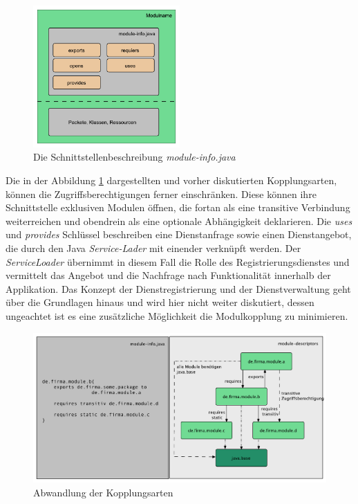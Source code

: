     \begin{figure}[h!]
      \centering
      \includegraphics[width=0.5\textwidth]{material/images/module-info.pdf}
      \caption{Die Schnittstellenbeschreibung \textit{module-info.java}}
      \label{fig:module-info}
    \end{figure}

    Die in der Abbildung \ref{fig:module-info} dargestellten und vorher diskutierten Kopplungsarten, können die Zugriffsberechtigungen ferner einschränken. Diese können ihre Schnittstelle exklusiven Modulen öffnen, die fortan als eine transitive Verbindung weiterreichen und obendrein als eine optionale Abhängigkeit deklarieren. Die \textit{uses} und \textit{provides} Schlüssel beschreiben eine Dienstanfrage sowie einen Dienstangebot, die durch den Java \textit{Service-Lader} mit einender verknüpft werden.\newline
    Der \textit{ServiceLoader} übernimmt in diesem Fall die Rolle des Registrierungsdienstes und vermittelt das Angebot und die Nachfrage nach Funktionalität innerhalb der Applikation. Das Konzept der Dienstregistrierung und der Dienstverwaltung geht über die Grundlagen hinaus und wird hier nicht weiter diskutiert, dessen ungeachtet ist es eine zusätzliche Möglichkeit die Modulkopplung zu minimieren. \cite{softModDes,modulMitJava9} \bigbreak

      \begin{figure}[h!]
      \centering
      \includegraphics[width=\textwidth]{material/images/transitiv.pdf}
      \caption{Abwandlung der Kopplungsarten}
      \label{fig:abw-kopl}
  \end{figure}

